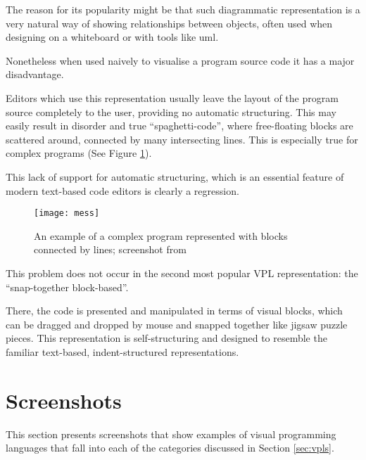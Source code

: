 The reason for its popularity might be that such diagrammatic representation is a very natural way of showing relationships between objects, often used when designing on a whiteboard\cite{whiteboard_design} or with tools like \acrlong{uml}\cite{uml}.

Nonetheless when used naively to visualise a program source code it has a major disadvantage.

Editors which use this representation usually leave the layout of the program source completely to the user, providing no automatic structuring. This may easily result in disorder and true ``spaghetti-code'', where free-floating blocks are scattered around, connected by many intersecting lines. This is especially true for complex programs (See Figure \ref{fig:mess}).

This lack of support for automatic structuring, which is an essential feature of
modern text-based code editors is clearly a regression.

\begin{figure}[h!]
    \centering \texttt{[image: mess]}
    \caption{
        An example of a complex program represented with blocks connected by lines;
        screenshot from \protect\cite{fig_mess}
    }
    \label{fig:mess}
\end{figure}

This problem does not occur in the second most popular VPL representation: the ``snap-together block-based''.

There, the code is presented and manipulated in terms of visual blocks, which can be dragged and dropped by mouse and snapped together like jigsaw puzzle pieces. This representation is self-structuring and designed to resemble the familiar text-based, indent-structured representations.


\clearpage
\section{Screenshots}\label{sec:screenshots}
This section presents screenshots that show examples of visual programming languages that fall into each of the categories discussed in Section \ref{sec:vpls}.


